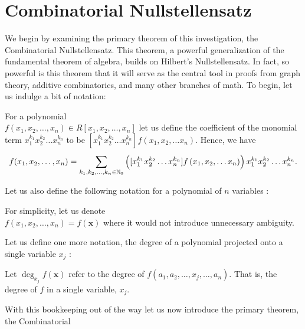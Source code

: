 \section{Combinatorial Nullstellensatz} We begin by
examining the primary theorem of this investigation, the Combinatorial
Nullstellensatz. This theorem, a powerful generalization of the fundamental
theorem of algebra, builds on Hilbert's Nullstellensatz. In fact, so powerful
is this theorem that it will serve as the central tool in proofs from graph
theory, additive combinatorics, and many other branches of math. To begin, let
us indulge a bit of notation: \begin{notation} For
	a polynomial\\ $f(x_1, x_2, \ldots, x_{n}) \in R[x_1,x_2, \ldots,
	x_{n}]$ let us define the coefficient of the monomial term
	$x_1^{k_1}x_2^{k_2}\ldots x_{n}^{k_n}$ to be $[x_1^{k_1}x_2^{k_2}\ldots
	x_{n}^{k_n}]f\left( x_1,x_2,\ldots x_{n} \right) $. Hence, we have \[ f(x_1, x_2, \ldots, x_{n}) = \sum_{k_1, k_2, \ldots, k_n \in
			\mathbb{N}_0}^{}\left( [x_1^{k_1}x_2^{k_2}\ldots
		x_{n}^{k_n}]f\left( x_1,x_2,\ldots x_{n} \right)\right)
		x_1^{k_1}x_2^{k_2}\ldots x_{n}^{k_n}   .\]
		\end{notation} Let us also define the following notation for a
		polynomial of $n$ variables : \begin{notation} For simplicity, let us denote\\ $f\left(
		x_1, x_2, \ldots, x_{n} \right) = f\left( \textbf{x} \right) $
	where it would not introduce unnecessary ambiguity.  \end{notation} Let
	us define one more notation, the degree of a polynomial projected onto
	a single variable $x_{j}$ : \begin{notation} Let $\deg_{x_{j}} f \left( \textbf{x} \right)$
		refer to the degree of $f\left( a_1, a_2, \ldots, x_{j},
		\ldots, a_n \right) $. That is, the degree of $f$ in a single variable, $x_{j}$.  \end{notation}
		\newpage With this bookkeeping out of the way let us now
		introduce the primary theorem, the Combinatorial
